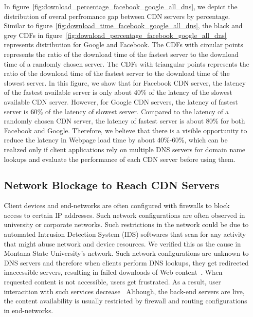 \documentclass{llncs}
\begin{document}
In figure~\ref{fig:download_percentage_facebook_google_all_dns}, we depict the distribution of overal perfromance gap between CDN servers by percentage.
Similar to figure~\ref{fig:download_time_facebook_google_all_dns}, the black and grey CDFs in figure~\ref{fig:download_percentage_facebook_google_all_dns} represents distribution for Google and Facebook.
The CDFs with circular points represents the ratio of the download time of the fastest server to the download time of a randomly chosen server.
The CDFs with triangular points represents the ratio of the download time of the fastest server to the download time of the slowest server.
In this figure, we show that for Facebook CDN server, the latency of the fastest available server is only about 40\% of the latency of the slowest available CDN server.
However, for Google CDN servers, the latency of fastest server is 60\% of the latency of slowest server.
Compared to the latency of a randomly chosen CDN server, the latency of fastest server is about 80\% for both Facebook and Google.
Therefore, we believe that there is a visible opportunity to reduce the latency in Webpage load time by about 40\%-60\%, which can be realized only if client applications rely on multiple DNS servers for domain name lookups and evaluate the performance of each CDN server before using them. 



\subsection{Network Blockage to Reach CDN Servers}

Client devices and end-networks are often configured with firewalls to block access to certain IP addresses.
Such network configurations are often observed in university or corporate networks.
Such restrictions in the network could be due to automated Intrusion Detection System (IDS) softwares that scan for any activity that might abuse network and device resources.
We verified this as the cause in Montana State University's network.
Such network configurations are unknown to DNS servers and therefore when clients perform DNS lookups, they get redirected inaccessible servers, resulting in failed downloads of Web content~\cite{facebook:failedimage}\cite{facebook:failedimage1}\cite{facebookfailedimage:techspot}\cite{facebookfailedimage:techsupportforum}.
When requested content is not accessible, users get frustrated.
As a result, user interacition with such services decrease~\cite{RadarVelocity09} 
Although, the back-end servers are live, the content availability is usually restricted by firewall and routing configurations in end-networks. 
\end{document}
